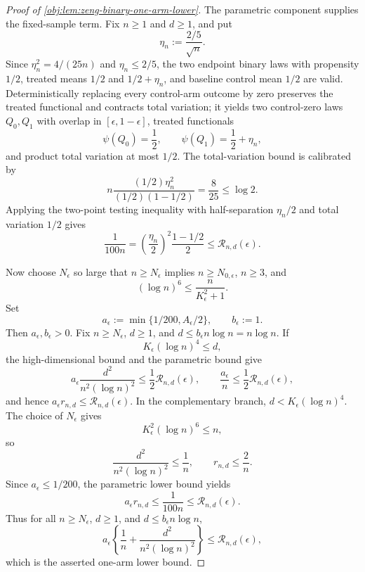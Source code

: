 \begin{proof}[Proof of \cref{obj:lem:zeng-binary-one-arm-lower}]
The parametric component supplies the fixed-sample term.  Fix \(n\ge1\) and \(d\ge1\), and put
\[
\eta_n:=\frac{2/5}{\sqrt n}.
\]
Since \(\eta_n^2=4/(25n)\) and \(\eta_n\le2/5\), the two endpoint binary laws with propensity \(1/2\), treated means \(1/2\) and \(1/2+\eta_n\), and baseline control mean \(1/2\) are valid.  Deterministically replacing every control-arm outcome by zero preserves the treated functional and contracts total variation; it yields two control-zero laws \(Q_0,Q_1\) with overlap in \([\epsilon,1-\epsilon]\), treated functionals
\[
\psi(Q_0)=\frac12,
\qquad
\psi(Q_1)=\frac12+\eta_n,
\]
and product total variation at most \(1/2\).  The total-variation bound is calibrated by
\[
n\frac{(1/2)\eta_n^2}{(1/2)(1-1/2)}
=\frac{8}{25}
\le \log 2 .
\]
Applying the two-point testing inequality with half-separation \(\eta_n/2\) and total variation \(1/2\) gives
\[
\frac{1}{100n}
=
\left(\frac{\eta_n}{2}\right)^2\frac{1-1/2}{2}
\le \mathcal R_{n,d}(\epsilon).
\]

Now choose \(N_\epsilon\) so large that \(n\ge N_\epsilon\) implies \(n\ge N_{0,\epsilon}\), \(n\ge3\), and
\[
(\log n)^6\le \frac{n}{K_\epsilon^2+1}.
\]
Set
\[
a_\epsilon:=\min\{1/200,A_\epsilon/2\},
\qquad
b_\epsilon:=1 .
\]
Then \(a_\epsilon,b_\epsilon>0\).  Fix \(n\ge N_\epsilon\), \(d\ge1\), and \(d\le b_\epsilon n\log n=n\log n\).  If
\[
K_\epsilon(\log n)^4\le d,
\]
the high-dimensional bound and the parametric bound give
\[
a_\epsilon\frac{d^2}{n^2(\log n)^2}
\le \frac12\mathcal R_{n,d}(\epsilon),
\qquad
\frac{a_\epsilon}{n}
\le \frac12\mathcal R_{n,d}(\epsilon),
\]
and hence \(a_\epsilon r_{n,d}\le\mathcal R_{n,d}(\epsilon)\).  In the complementary branch, \(d<K_\epsilon(\log n)^4\).  The choice of \(N_\epsilon\) gives
\[
K_\epsilon^2(\log n)^6\le n,
\]
so
\[
\frac{d^2}{n^2(\log n)^2}
\le \frac1n,
\qquad
r_{n,d}\le \frac2n .
\]
Since \(a_\epsilon\le1/200\), the parametric lower bound yields
\[
a_\epsilon r_{n,d}
\le \frac{1}{100n}
\le \mathcal R_{n,d}(\epsilon).
\]
Thus for all \(n\ge N_\epsilon\), \(d\ge1\), and \(d\le b_\epsilon n\log n\),
\[
a_\epsilon\left\{\frac1n+\frac{d^2}{n^2(\log n)^2}\right\}
\le \mathcal R_{n,d}(\epsilon),
\]
which is the asserted one-arm lower bound.
\end{proof}
